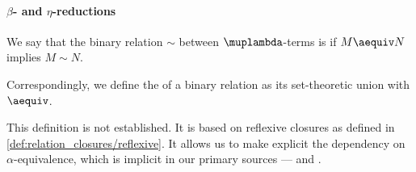 \paragraph{\( \beta \)- and \( \eta \)-reductions}

\begin{definition}\label{def:alpha_reflexive}\mimprovised
  We say that the binary relation \( {\sim} \) between \( \muplambda \)-terms is  if \( M \aequiv N \) implies \( M \sim N \).

  Correspondingly, we define the  of a binary relation as its set-theoretic union with \( {\aequiv} \).
\end{definition}
\begin{comments}
  \item This definition is not established. It is based on reflexive closures as defined in \cref{def:relation_closures/reflexive}. It allows us to make explicit the dependency on \( \alpha \)-equivalence, which is implicit in our primary sources --- \cite[ch. 3]{Barendregt1984LambdaCalculus} and \cite[def. 1B2]{Hindley1997BasicSTT}.
\end{comments}

